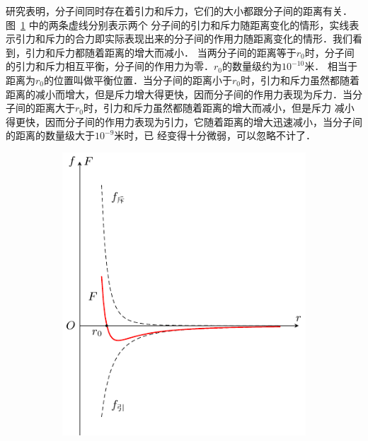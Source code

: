 研究表明，分子间同时存在着引力和斥力，它们的大小都跟分子间的距离有关．图~\ref{fig_B_1-7a} 中的两条虚线分别表示两个
分子间的引力和斥力随距离变化的情形，实线表示引力和斥力的合力即实际表现出来的分子间的作用力随距离变化的情形．我们看到，引力和斥力都随着距离的增大而减小．
当两分子间的距离等于$r_0$时，分子间的引力和斥力相互平衡，分子间的作用力为零．$r_0$的数量级约为$10^{-10}$米．
相当于距离为$r_0$的位置叫做平衡位置．当分子间的距离小于$r_0$时，引力和斥力虽然都随着距离的减小而增大，但是斥力增大得更快，因而分子间的作用力表现为斥力．当分子间的距离大于$r_0$时，引力和斥力虽然都随着距离的增大而减小，但是斥力
减小得更快，因而分子间的作用力表现为引力，它随着距离的增大迅速减小，当分子间的距离的数量级大于$10^{-9}$米时，已
经变得十分微弱，可以忽略不计了．
\begin{figure}[htbp]
    \centering
    \begin{subfigure}{0.4\linewidth}
        \centering
        \includegraphics{fig/B/1-7a.pdf}
        \caption{}\label{fig_B_1-7a}
    \end{subfigure}
    \hfil
    \begin{subfigure}{0.4\linewidth}
        \centering

\end{subfigure}
\end{figure}
